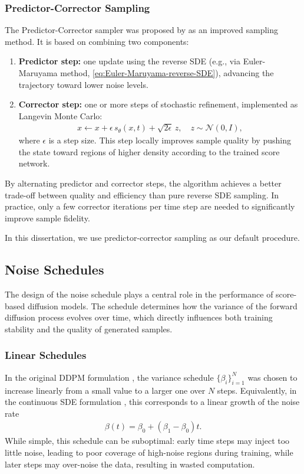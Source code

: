 \documentclass[a4paper,12pt]{article}
\begin{document}
\subsubsection{Predictor-Corrector Sampling}\label{sec:PC-sampling}
The Predictor-Corrector sampler was proposed by \citet{song2021ScoreBasedGenerativeModeling} as an improved sampling method. It is based on combining two components:
\begin{enumerate}
    \item \textbf{Predictor step:} one update using the reverse SDE (e.g., via Euler-Maruyama method, \cref{eq:Euler-Maruyama-reverse-SDE}), advancing the trajectory toward lower noise levels.
    \item \textbf{Corrector step:} one or more steps of stochastic refinement, implemented as Langevin Monte Carlo:
        \begin{align*}
            x \leftarrow x + \epsilon\, s_\theta(x,t) + \sqrt{2\epsilon}\,z, \quad z \sim \mathcal{N}(0,I),
        \end{align*}
        where \(\epsilon\) is a step size. This step locally improves sample quality by pushing the state toward regions of higher density according to the trained score network.
\end{enumerate}
By alternating predictor and corrector steps, the algorithm achieves a better trade-off between quality and efficiency than pure reverse SDE sampling. 
In practice, only a few corrector iterations per time step are needed to significantly improve sample fidelity.

In this dissertation, we use predictor-corrector sampling as our default procedure.

\subsection{Noise Schedules}
The design of the noise schedule plays a central role in the performance of score-based diffusion models. 
The schedule determines how the variance of the forward diffusion process evolves over time, which directly influences both training stability and the quality of generated samples.

\subsubsection{Linear Schedules}
In the original DDPM formulation \citep{hoDenoisingDiffusionProbabilistic2020}, the variance schedule \(\{\beta_i\}_{i=1}^N\) was chosen to increase linearly from a small value to a larger one over \(N\) steps. Equivalently, in the continuous SDE formulation \citep{song2021ScoreBasedGenerativeModeling}, this corresponds to a linear growth of the noise rate
\begin{align*}
    \beta\!\left(t\right)=\beta_0+\left(\beta_1-\beta_0\right)t.
\end{align*}
While simple, this schedule can be suboptimal: early time steps may inject too little noise, leading to poor coverage of high-noise regions during training, while later steps may over-noise the data, resulting in wasted computation.
\end{document}
